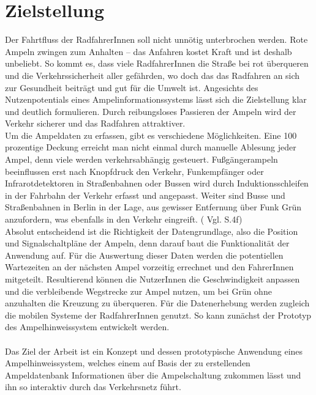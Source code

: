 \section{Zielstellung}
Der Fahrtfluss der RadfahrerInnen soll nicht unnötig unterbrochen werden. Rote Ampeln zwingen zum Anhalten -- das Anfahren kostet Kraft und ist deshalb unbeliebt. So kommt es, dass viele RadfahrerInnen die Straße bei rot überqueren und die Verkehrssicherheit aller gefährden, wo doch das das Radfahren an sich zur Gesundheit beiträgt und gut für die Umwelt ist. Angesichts des Nutzenpotentials eines Ampelinformationssystems lässt sich die Zielstellung klar und deutlich formulieren. Durch reibungsloses Passieren der Ampeln wird der Verkehr sicherer und das Radfahren attraktiver.\\
Um die Ampeldaten zu erfassen, gibt es verschiedene Möglichkeiten. Eine 100 prozentige Deckung erreicht man nicht einmal durch manuelle Ablesung jeder Ampel, denn viele  werden verkehrsabhängig gesteuert. Fußgängerampeln beeinflussen erst nach Knopfdruck den Verkehr, Funkempfänger oder Infrarotdetektoren in Straßenbahnen oder Bussen wird durch Induktionsschleifen in der Fahrbahn der Verkehr erfasst und angepasst. Weiter sind Busse und Straßenbahnen in Berlin in der Lage, aus gewisser Entfernung über Funk Grün anzufordern, was ebenfalls in den Verkehr eingreift. ( Vgl. \cite{lsa_bln} S.4f) \\
Absolut entscheidend ist die Richtigkeit der Datengrundlage, also die Position und Signalschaltpläne der Ampeln, denn darauf baut die Funktionalität der Anwendung auf.
Für die Auswertung dieser Daten werden die potentiellen Wartezeiten an der nächsten Ampel vorzeitig errechnet und den FahrerInnen mitgeteilt. Resultierend können die NutzerInnen die Geschwindigkeit anpassen und die verbleibende Wegstrecke zur Ampel nutzen, um bei Grün ohne anzuhalten die Kreuzung zu überqueren. Für die Datenerhebung werden zugleich die mobilen Systeme der RadfahrerInnen genutzt. So kann zunächst der Prototyp des Ampelhinweissystem entwickelt werden.\\\\
Das Ziel der Arbeit ist ein Konzept und dessen prototypische Anwendung eines Ampelhinweissystem, welches einem auf Basis der zu erstellenden  Ampeldatenbank Informationen über die Ampelschaltung zukommen lässt und ihn so interaktiv durch das Verkehrsnetz führt.
%
%
